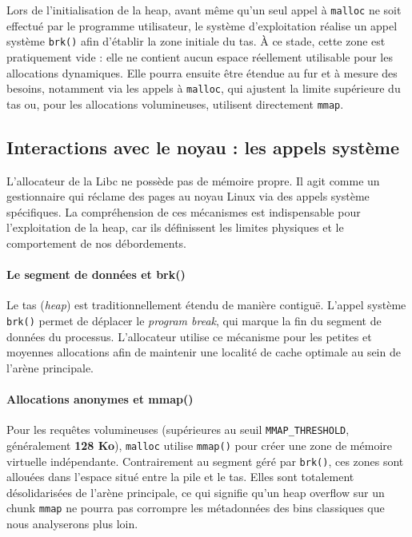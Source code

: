 Lors de l'initialisation de la heap, avant même qu'un seul appel à \texttt{malloc} ne soit effectué par le programme utilisateur, le système d'exploitation réalise un appel système \texttt{brk()} afin d'établir la zone initiale du tas.  
À ce stade, cette zone est pratiquement vide : elle ne contient aucun espace réellement utilisable pour les allocations dynamiques.  
Elle pourra ensuite être étendue au fur et à mesure des besoins, notamment via les appels à \texttt{malloc}, qui ajustent la limite supérieure du tas ou, pour les allocations volumineuses, utilisent directement \texttt{mmap}.

\subsection{Interactions avec le noyau : les appels système}

L'allocateur de la Libc ne possède pas de mémoire propre. Il agit comme un gestionnaire qui réclame des pages au noyau Linux via des appels système spécifiques. La compréhension de ces mécanismes est indispensable pour l'exploitation de la heap, car ils définissent les limites physiques et le comportement de nos débordements.

\paragraph{Le segment de données et brk()}
Le tas (\textit{heap}) est traditionnellement étendu de manière contiguë. L'appel système \texttt{brk()} permet de déplacer le \textit{program break}, qui marque la fin du segment de données du processus. L'allocateur utilise ce mécanisme pour les petites et moyennes allocations afin de maintenir une localité de cache optimale au sein de l'arène principale.

\paragraph{Allocations anonymes et mmap()}
Pour les requêtes volumineuses (supérieures au seuil \texttt{MMAP\_THRESHOLD}, généralement \textbf{128 Ko}), \texttt{malloc} utilise \texttt{mmap()} pour créer une zone de mémoire virtuelle indépendante. Contrairement au segment géré par \texttt{brk()}, ces zones sont allouées dans l'espace situé entre la pile et le tas. Elles sont totalement désolidarisées de l'arène principale, ce qui signifie qu'un heap overflow sur un chunk \texttt{mmap} ne pourra pas corrompre les métadonnées des bins classiques que nous analyserons plus loin.

